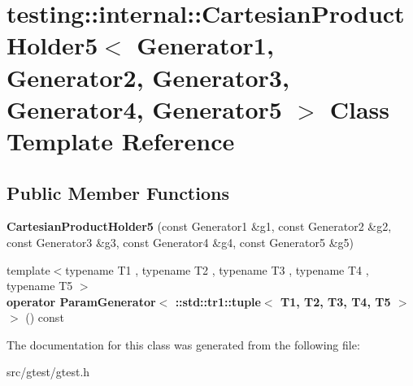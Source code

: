 \hypertarget{classtesting_1_1internal_1_1_cartesian_product_holder5}{}\section{testing\+:\+:internal\+:\+:Cartesian\+Product\+Holder5$<$ Generator1, Generator2, Generator3, Generator4, Generator5 $>$ Class Template Reference}
\label{classtesting_1_1internal_1_1_cartesian_product_holder5}
\subsection*{Public Member Functions}
\begin{DoxyCompactItemize}
\item 
\mbox{\label{classtesting_1_1internal_1_1_cartesian_product_holder5_afb3a413ff0e59f31e621937f968d0923}} 
{\bfseries Cartesian\+Product\+Holder5} (const Generator1 \&g1, const Generator2 \&g2, const Generator3 \&g3, const Generator4 \&g4, const Generator5 \&g5)
\item 
\mbox{\label{classtesting_1_1internal_1_1_cartesian_product_holder5_ad5c5e26baf2049d10f5ed5f3cc1257e3}} 
{\footnotesize template$<$typename T1 , typename T2 , typename T3 , typename T4 , typename T5 $>$ }\\{\bfseries operator Param\+Generator$<$ \+::std\+::tr1\+::tuple$<$ T1, T2, T3, T4, T5 $>$ $>$} () const
\end{DoxyCompactItemize}


The documentation for this class was generated from the following file\+:\begin{DoxyCompactItemize}
\item 
src/gtest/gtest.\+h\end{DoxyCompactItemize}
